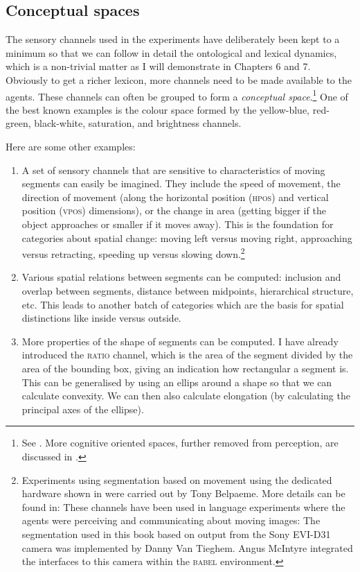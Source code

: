 \subsection{Conceptual spaces}

The sensory channels used in the experiments have
deliberately been kept to a minimum so that we can follow 
in detail the ontological and lexical dynamics, which is a 
non-trivial matter as I will demonstrate in Chapters 6 and 7.
Obviously to get a richer lexicon, more channels need to be made 
available to the agents. These channels can often be 
grouped to form a {\it conceptual space}.\footnote{See \cite{Gardenfors:1999}. 
More cognitive oriented spaces, further removed 
from perception, are discussed in \cite{Fauconnier:1994}.} One of the 
best known examples is the colour space formed by the
yellow-blue, red-green, black-white, saturation, and brightness channels. 

\clearpage
Here are some other examples: 
\begin{enumerate}
\item A set of sensory channels that are sensitive 
to characteristics of moving segments can easily be 
imagined. They include the speed
of movement, the direction of movement (along the 
horizontal position (\textsc{hpos}) and vertical position (\textsc{vpos}) 
dimensions), or the change in area (getting bigger if the object 
approaches or smaller if it moves away). This is the foundation
for categories about spatial change: moving left versus moving right,
approaching versus retracting, speeding up versus slowing down.\footnote{Experiments
using segmentation based on movement
using the dedicated hardware shown in  were carried out by Tony Belpaeme. 
More details can be found in: \cite{Belpaeme:1998} These channels have been used in
language experiments where the agents were 
perceiving and communicating about moving 
images: \cite{Steels:1998}  
The segmentation used in this book 
based on output from the Sony EVI-D31 camera was 
implemented by Danny Van Tieghem. Angus McIntyre integrated
the interfaces to this camera within the \textsc{babel} environment. 
}

\item Various spatial relations between segments can be computed: 
inclusion and overlap between segments, distance between 
midpoints, hierarchical structure, etc. 
This leads to another batch of categories which are
the basis for spatial distinctions like inside versus outside. 

\item More properties of the shape of segments can be computed.
I have already introduced the \textsc{ratio} channel, which is the area of the 
segment divided by the area of the bounding box, giving an 
indication how rectangular a segment is. This can be generalised
by using an ellips around a shape so that we can calculate
convexity. We can then also calculate elongation (by calculating
the principal axes of the ellipse). 
\end{enumerate}

